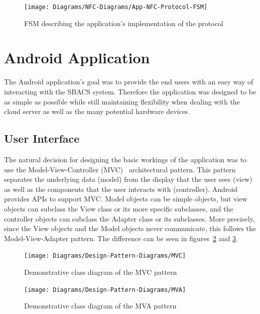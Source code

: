 \documentclass[12pt]{report}
\let\Oldsection\section
\renewcommand{\section}{\FloatBarrier\Oldsection}
\let\Oldsubsection\subsection
\renewcommand{\subsection}{\FloatBarrier\Oldsubsection}
\begin{document}
\begin{figure}
    \texttt{[image: Diagrams/NFC-Diagrams/App-NFC-Protocol-FSM]}
    \caption{FSM describing the application's implementation of the protocol}
    \label{fig:nfc-protocol-fsm-app}
\end{figure}


\section{Android Application} \label{android-application}

The Android application's goal was to provide the end users with an easy way of interacting with the SBACS system.
Therefore the application was designed to be as simple as possible while still maintaining flexibility when dealing with
the cloud server as well as the many potential hardware devices.


\subsection{User Interface} \label{user-interface}

The natural decision for designing the basic workings of the application was to use the Model-View-Controller (MVC)~\autocite{MVC} 
architectural pattern. This pattern separates the underlying data (model) from the display that the user sees (view) as well as
the components that the user interacts with (controller). Android provides APIs to support MVC. Model objects can be
simple objects, but view objects can subclass the View class or its more specific subclasses, and the controller
objects can subclass the Adapter class or its subclasses. More precisely, since the View objects and the Model objects
never communicate, this follows the Model-View-Adapter pattern. The difference can be seen in figures~\ref{fig:MVC} and
\ref{fig:MVA}.


\begin{figure}
    \centering
    \texttt{[image: Diagrams/Design-Pattern-Diagrams/MVC]}
    \caption{Demonstrative class diagram of the MVC pattern}
    \label{fig:MVC}
\end{figure}

\begin{figure}
    \centering
    \texttt{[image: Diagrams/Design-Pattern-Diagrams/MVA]}
    \caption{Demonstrative class diagram of the MVA pattern}
    \label{fig:MVA}
\end{figure}
\end{document}

